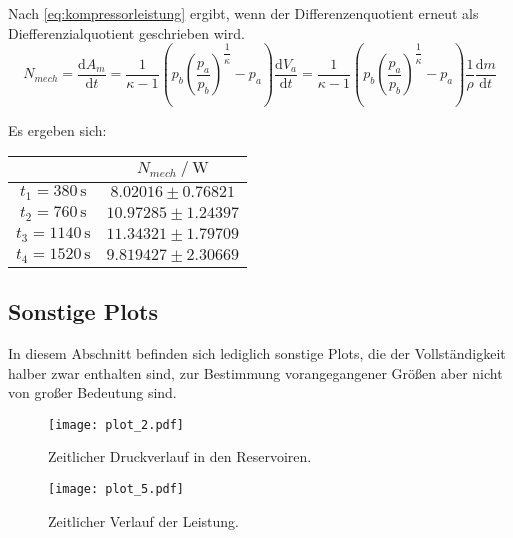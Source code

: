 Nach \eqref{eq:kompressorleistung} ergibt, wenn der Differenzenquotient erneut als Diefferenzialquotient geschrieben wird.
\begin{equation}
N_{mech}= \dfrac{\text{d}A_m}{\text{d}t} = \dfrac{1}{κ-1} \left(p_b\left(\dfrac{p_a}{p_b}\right)^{\dfrac{1}{κ}}-p_a\right) \dfrac{\text{d}V_a}{\text{d}t} = 
    \dfrac{1}{κ-1} \left (p_b \left(\dfrac{p_a}{p_b} \right)^{\dfrac{1}{κ}}-p_a \right) \dfrac{1}{ρ}\dfrac{\text{d}m}{\text{d}t}
\end{equation}

Es ergeben sich:

\begin{table}[H]
  \centering
  \label{tab:kompressorleistung}
  \begin{tabular}{S S}
    \toprule
    & {$N_{mech} \mathbin{/} \unit{\watt}$} \\
    \midrule
    {$t_1 = 380  \, \unit{\second}$} & {$ 8.02016 \pm 0.76821$} \\
    {$t_2 = 760  \, \unit{\second}$} & {$10.97285 \pm 1.24397$} \\
    {$t_3 = 1140 \, \unit{\second}$} & {$11.34321 \pm 1.79709$} \\
    {$t_4 = 1520 \, \unit{\second}$} & {$9.819427 \pm 2.30669$} \\
    \bottomrule
  \end{tabular}
\end{table}


\subsection{Sonstige Plots}

In diesem Abschnitt befinden sich lediglich sonstige Plots, die der Vollständigkeit halber zwar enthalten sind, zur 
Bestimmung vorangegangener Größen aber nicht von großer Bedeutung sind.


\begin{figure}
  \centering
  \texttt{[image: plot\_2.pdf]}
  \caption{Zeitlicher Druckverlauf in den Reservoiren.}
  \label{fig:plot3}
\end{figure}


\begin{figure}
  \centering
  \texttt{[image: plot\_5.pdf]}
  \caption{Zeitlicher Verlauf der Leistung.}
  \label{fig:plot5}
\end{figure}
